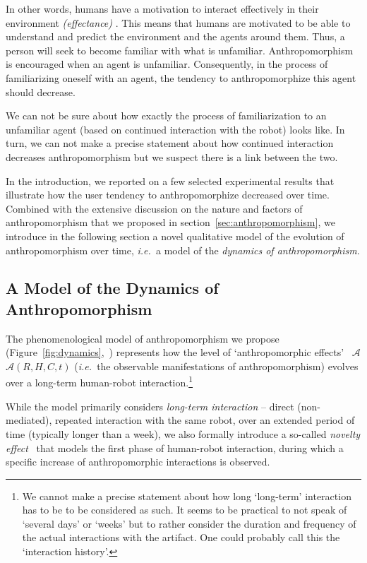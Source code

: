 \documentclass{frontiersSCNS} %
\newcommand{\ie}{{\textit{i.e.~}}}
\newcommand{\Ant}[1][]{%
      \ifthenelse{\isempty{#1}}%
        {$\mathcal{A}$}
        {$\mathcal{A}(#1)$}
}
\begin{document}
In other words, humans have a motivation to interact
effectively in their environment \textit{(effectance)} \citep{epley_when_2008}.
This means that humans are motivated to be able to understand and predict the
environment and the agents around them. Thus, a person will seek to become familiar with what is unfamiliar. Anthropomorphism is encouraged when an agent is unfamiliar. Consequently, in the process of familiarizing oneself with an agent, the tendency to anthropomorphize this agent should decrease.

We can not be sure about how exactly the process of familiarization to an unfamiliar agent (based on continued interaction with the robot) looks like. In turn, we can not make a precise statement about how continued interaction decreases anthropomorphism but we suspect there is a link between the two.

In the introduction, we reported on a few selected experimental results that
illustrate how the user tendency to anthropomorphize decreased over time.
Combined with the extensive discussion on the nature and factors of
anthropomorphism that we proposed in section~\ref{sec:anthropomorphism}, we
introduce in the following section a novel qualitative model of the evolution
of anthropomorphism over time, \ie a model of the \emph{dynamics of anthropomorphism}.


\subsection{A Model of the Dynamics of Anthropomorphism}
\label{sec:dynamics-model}

The phenomenological model of anthropomorphism we propose
(Figure~\ref{fig:dynamics},~\citep{lemaignan2014dynamics}) represents how the
level of `anthropomorphic effects'~\Ant[R,H,C,t] (\ie the observable
manifestations of anthropomorphism) evolves over a long-term human-robot
interaction.\footnote{We cannot make a precise statement about how long `long-term' interaction has to be to be considered as such. It seems to be practical to not speak of `several days' or `weeks' but to rather consider the duration and frequency of the actual interactions with the artifact. One could probably call this the `interaction history'.}

While the model primarily considers \emph{long-term interaction} -- direct
(non-mediated), repeated interaction with the same robot, over an extended
period of time (typically longer than a week), we also formally introduce a
so-called \emph{novelty effect}~\citep{kanda_interactive_2004} that models the
first phase of human-robot interaction, during which a specific increase of
anthropomorphic interactions is observed.
\end{document}
